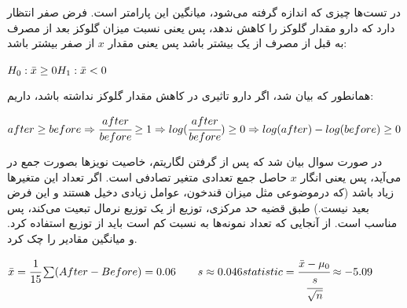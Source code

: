 \documentclass[12pt]{article}
\begin{document}
در تست‌ها چیزی که اندازه گرفته می‌شود، میانگین این پارامتر است.
فرض صفر انتظار دارد که دارو مقدار گلوکز را کاهش ندهد، پس یعنی نسبت میزان گلوکز بعد از مصرف به قبل از مصرف از یک بیشتر باشد پس یعنی مقدار
$x$
از صفر بیشتر باشد:
\begin{latin}
	$
	\\
	H_0: \bar{x} \geq 0 \\
	H_1: \bar{x} < 0
	$
\end{latin}
همانطور که بیان شد، اگر دارو تاثیری در کاهش مقدار گلوکز نداشته باشد، داریم:
\begin{latin}
	$
	after \geq before \Rightarrow \cfrac{after}{before} \geq 1 
	\Rightarrow log(\cfrac{after}{before}) \geq 0
	\Rightarrow log(after) - log(before) \geq 0
	$
\end{latin}
در صورت سوال بیان شد که پس از گرفتن لگاریتم، خاصیت نویز‌ها بصورت جمع در می‌آید، پس یعنی انگار
$x$
حاصل جمع تعدادی متغیر تصادفی است. اگر تعداد این متغیرها زیاد باشد (که درموضوعی مثل میزان قندخون، عوامل زیادی دخیل هستند و این فرض بعید نیست.) طبق قضیه حد مرکزی، توزیع 
از یک توزیع نرمال تبعیت می‌کند، پس 
مناسب است. از آنجایی که تعداد نمونه‌ها به نسبت کم است باید از توزیع 
استفاده کرد. و میانگین مقادیر 
را چک کرد.
\begin{latin}
		$
		\\
	\bar{x} = \cfrac{1}{15} \sum (After - Before) = 0.06
	\qquad 
	s \approx 0.046
	\\
	statistic = \cfrac{\bar{x} - \mu_0}{\cfrac{s}{\sqrt{n}}} \approx -5.09
	$
\end{latin}
\end{document}
